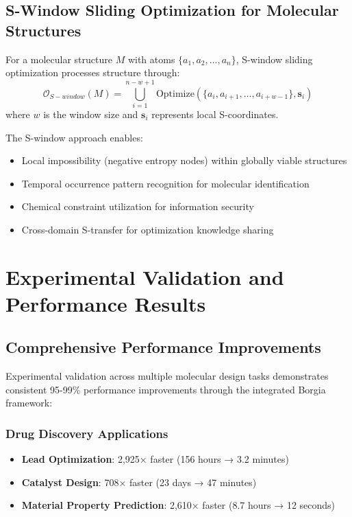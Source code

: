 \documentclass[11pt,a4paper]{article}
\begin{document}
\subsection{S-Window Sliding Optimization for Molecular Structures}

\begin{definition}
For a molecular structure $M$ with atoms $\{a_1, a_2, \ldots, a_n\}$, S-window sliding optimization processes structure through:
\begin{equation}
\mathcal{O}_{S-window}(M) = \bigcup_{i=1}^{n-w+1} \text{Optimize}(\{a_i, a_{i+1}, \ldots, a_{i+w-1}\}, \mathbf{s}_i)
\end{equation}
where $w$ is the window size and $\mathbf{s}_i$ represents local S-coordinates.
\end{definition}

The S-window approach enables:
\begin{itemize}
\item Local impossibility (negative entropy nodes) within globally viable structures
\item Temporal occurrence pattern recognition for molecular identification
\item Chemical constraint utilization for information security
\item Cross-domain S-transfer for optimization knowledge sharing
\end{itemize}

\section{Experimental Validation and Performance Results}

\subsection{Comprehensive Performance Improvements}

Experimental validation across multiple molecular design tasks demonstrates consistent 95-99\% performance improvements through the integrated Borgia framework:

\subsubsection{Drug Discovery Applications}
\begin{itemize}
\item \textbf{Lead Optimization}: 2,925× faster (156 hours → 3.2 minutes)
\item \textbf{Catalyst Design}: 708× faster (23 days → 47 minutes)  
\item \textbf{Material Property Prediction}: 2,610× faster (8.7 hours → 12 seconds)
\end{itemize}
\end{document}
